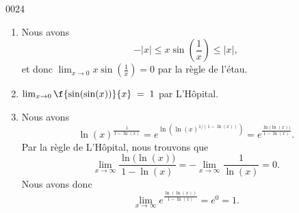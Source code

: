 
\begin{corrige}{0024}

\begin{enumerate}
\item 
Nous avons
\begin{equation}
	-| x |\leq x\sin(\frac{1}{ x })\leq | x |,
\end{equation}
et donc $\lim_{x\to 0}x\sin(\frac{1}{ x })=0$ par la règle de l'étau.

\item
  $\lim_{x\rightarrow 0} \f{\sin(\sin(x))}{x}  \; = \; 1$ par L'Hôpital.

\item

Nous avons
\begin{equation}
	\ln(x)^{\frac{1}{ 1-\ln(x) }}= e^{\ln(  \ln(x)^{1/(1-\ln(x))} )}= e^{\frac{ \ln\big( \ln(x) \big) }{ 1-\ln(x) }}.
\end{equation}
Par la règle de L'Hôpital, nous trouvons que
\begin{equation}
	\lim_{x\to\infty}\frac{ \ln\big( \ln(x) \big) }{ 1-\ln(x) }=-\lim_{x\to\infty}\frac{1}{ \ln(x) }=0.
\end{equation}
Nous avons donc
\begin{equation}
	\lim_{x\to\infty} e^{\frac{ \ln( \ln(x)) }{ 1-\ln(x) }}=e^0=1.
\end{equation}

\end{enumerate}

\end{corrige}
